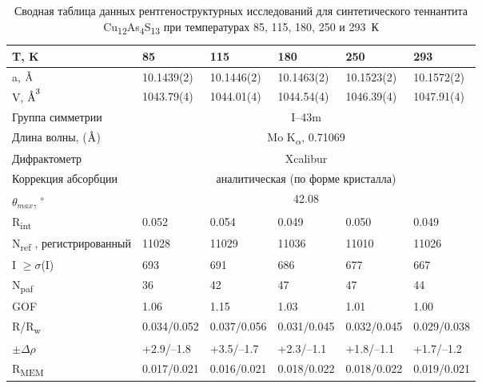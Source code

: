 \begin{landscape}
\begin{table} [htbp]
\centering
\caption{Сводная таблица данных рентгеноструктурных исследований для синтетического теннантита Cu\textsubscript{12}As\textsubscript{4}S\textsubscript{13} при температурах 85, 115, 180, 250 и 293~К}%
	\label{xray1}%
    \renewcommand{\arraystretch}{1.5}
	\begin{tabular}{@{}@{\extracolsep{20pt}}llllll@{}}
 \toprule     %
T, K                       & 85          & 115         & 180         & 250         & 293         \\
   \midrule
a, $\mbox{\normalfont\AA}$                       & 10.1439(2)  & 10.1446(2)  & 10.1463(2)  & 10.1523(2)  & 10.1572(2)  \\ \hline
V, $\mbox{\normalfont\AA}^3$                      & 1043.79(4)      & 1044.01(4)      & 1044.54(4)      & 1046.39(4)      & 1047.91(4)      \\ \hline
Группа симметрии                     &\multicolumn{5}{c}{ I–43m  }                                         \\ \hline
Длина волны, ($\mbox{\normalfont\AA}$) & \multicolumn{5}{c}{Mo K\textsubscript{$\alpha$}, 0.71069 } \\ \hline
Дифрактометр             & \multicolumn{5}{c}{Xcalibur}                                       \\ \hline
Коррекция абсорбции      & \multicolumn{5}{c}{аналитическая (по форме кристалла)} \\ \hline
$\theta_{max}$,\textsuperscript{ $\circ$ }                 &  \multicolumn{5}{c}{42.08 } \\ \hline
R\textsubscript{int}                       & 0.052       & 0.054       & 0.049       & 0.050       & 0.049       \\ \hline
N\textsubscript{ref} , регистрированный           & 11028       & 11029       & 11036       & 11010       & 11026       \\ \hline
I $\geq \sigma$(I)                  & 693         & 691         & 686         & 677         & 667         \\ \hline
N\textsubscript{paf}                       & 36          & 42          & 47          & 47          & 44          \\ \hline
GOF                        & 1.06        & 1.15        & 1.03        & 1.01        & 1.00        \\ \hline
R/R\textsubscript{w}                     & 0.034/0.052 & 0.037/0.056 & 0.031/0.045 & 0.032/0.045 & 0.029/0.038 \\ \hline
$\pm\Delta\rho   $                     & +2.9/–1.8   & +3.5/–1.7   & +2.3/–1.1   & +1.8/–1.1   & +1.7/–1.2   \\ \hline
R\textsubscript{MEM}                     & 0.017/0.021 & 0.016/0.021 & 0.018/0.022 & 0.018/0.022 & 0.019/0.021\\ \hline
 \bottomrule
\end{tabular}
\end{table}
\end{landscape}



